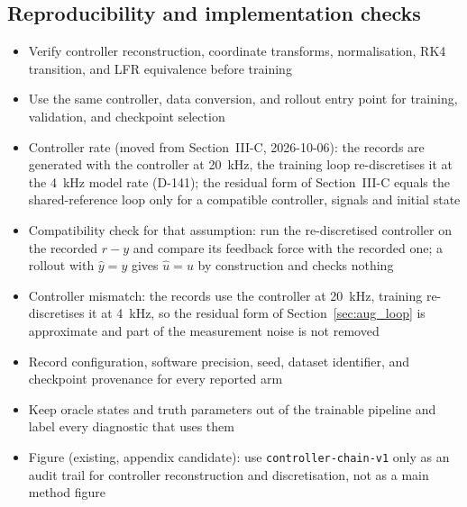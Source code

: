 \begin{wip}
\subsection{Reproducibility and implementation checks}
\begin{itemize}
\item Verify controller reconstruction, coordinate transforms, normalisation, RK4 transition, and LFR equivalence before training
\item Use the same controller, data conversion, and rollout entry point for training, validation, and checkpoint selection
\item Controller rate (moved from Section~III-C, 2026-10-06): the records are generated with the controller at 20~kHz, the training loop re-discretises it at the 4~kHz model rate (D-141); the residual form of Section~III-C equals the shared-reference loop only for a compatible controller, signals and initial state
\item Compatibility check for that assumption: run the re-discretised controller on the recorded $r-y$ and compare its feedback force with the recorded one; a rollout with $\hat y=y$ gives $\hat u=u$ by construction and checks nothing
\item Controller mismatch: the records use the controller at 20~kHz, training re-discretises it at 4~kHz, so the residual form of Section~\ref{sec:aug_loop} is approximate and part of the measurement noise is not removed
\item Record configuration, software precision, seed, dataset identifier, and checkpoint provenance for every reported arm
\item Keep oracle states and truth parameters out of the trainable pipeline and label every diagnostic that uses them
\item Figure (existing, appendix candidate): use \texttt{controller-chain-v1} only as an audit trail for controller reconstruction and discretisation, not as a main method figure
\end{itemize}
\end{wip}
